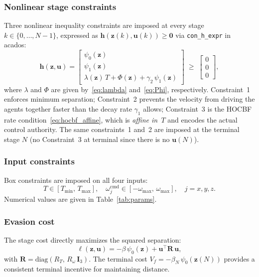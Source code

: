 \documentclass[lettersize,journal]{IEEEtran}
\theoremstyle{definition}
\theoremstyle{remark}
\newcommand{\vect}[1]{\bm{#1}}
\newcommand{\mat}[1]{\mathbf{#1}}
\begin{document}
\subsubsection*{Nonlinear stage constraints}
Three nonlinear inequality constraints are imposed at every stage
$k\in\{0,\ldots,N-1\}$, expressed as
$\vect{h}(\vect{z}(k),\vect{u}(k)) \geq \vect{0}$
via \texttt{con\_h\_expr} in acados:
\begin{equation}
\vect{h}(\vect{z},\vect{u}) =
\begin{bmatrix}
    \psi_0(\vect{z}) \\[3pt]
    \psi_1(\vect{z}) \\[3pt]
    \lambda(\vect{z})\,T + \Phi(\vect{z}) + \gamma_2\,\psi_1(\vect{z})
\end{bmatrix}
\;\geq\;
\begin{bmatrix}0\\0\\0\end{bmatrix},
\label{eq:con_h}
\end{equation}
where $\lambda$ and $\Phi$ are given by~\eqref{eq:lambda}
and~\eqref{eq:Phi}, respectively.
Constraint~1 enforces minimum separation;
Constraint~2 prevents the velocity from driving the agents together
faster than the decay rate $\gamma_1$ allows;
Constraint~3 is the HOCBF rate condition~\eqref{eq:hocbf_affine},
which is \emph{affine in~$T$} and encodes the actual control authority.
The same constraints~1 and~2 are imposed at the terminal stage $N$
(no Constraint~3 at terminal since there is no $\vect{u}(N)$).

\subsubsection*{Input constraints}
Box constraints are imposed on all four inputs:
\begin{equation}
    T \in [T_{\min},\,T_{\max}],\quad
    \omega_j^{\mathrm{cmd}} \in [-\omega_{\max},\,\omega_{\max}],
    \quad j=x,y,z.
    \label{eq:input_box}
\end{equation}
Numerical values are given in Table~\ref{tab:params}.

\subsubsection*{Evasion cost}
The stage cost directly maximizes the squared separation:
\begin{equation}
    \ell(\vect{z},\vect{u})
        = -\beta\,\psi_0(\vect{z})
          + \vect{u}^\top \mat{R}\,\vect{u},
    \label{eq:stage_cost}
\end{equation}
with $\mat{R} = \mathrm{diag}(R_T,\,R_\omega\,\mat{I}_3)$.
The terminal cost $V_f = -\beta_N\,\psi_0(\vect{z}(N))$ provides
a consistent terminal incentive for maintaining distance.
\end{document}
